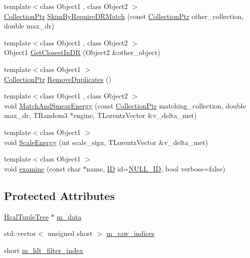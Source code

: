 \begin{DoxyCompactItemize}
\item 
{\footnotesize template$<$class Object1 , class Object2 $>$ }\\\hyperlink{_collection_8h_a64ea9217513944abee0afcb2ee82d787}{Collection\+Ptr} \hyperlink{class_collection_a54e900d55c4ac8031405cf47d9057cf2}{Skim\+By\+Require\+D\+R\+Match} (const \hyperlink{_collection_8h_a64ea9217513944abee0afcb2ee82d787}{Collection\+Ptr} other\+\_\+collection, double max\+\_\+dr)
\item 
{\footnotesize template$<$class Object1 , class Object2 $>$ }\\Object1 \hyperlink{class_collection_ae44c2ce07ad035fa796bd2c9b84f55dd}{Get\+Closest\+In\+D\+R} (Object2 \&other\+\_\+object)
\item 
{\footnotesize template$<$class Object1 $>$ }\\\hyperlink{_collection_8h_a64ea9217513944abee0afcb2ee82d787}{Collection\+Ptr} \hyperlink{class_collection_a49f4130580bee8e31bea180059ab6fc4}{Remove\+Duplicates} ()
\item 
{\footnotesize template$<$class Object1 , class Object2 $>$ }\\void \hyperlink{class_collection_af2614a9b9632132334040e925900774d}{Match\+And\+Smear\+Energy} (const \hyperlink{_collection_8h_a64ea9217513944abee0afcb2ee82d787}{Collection\+Ptr} matching\+\_\+collection, double max\+\_\+dr, T\+Random3 $\ast$engine, T\+Lorentz\+Vector \&v\+\_\+delta\+\_\+met)
\item 
{\footnotesize template$<$class Object1 $>$ }\\void \hyperlink{class_collection_a2d8d04525e4b5ad9fdb0e561ab407ed0}{Scale\+Energy} (int scale\+\_\+sign, T\+Lorentz\+Vector \&v\+\_\+delta\+\_\+met)
\item 
{\footnotesize template$<$class Object1 $>$ }\\void \hyperlink{class_collection_a597be8599a7546094dc33a2dcaadca74}{examine} (const char $\ast$name, \hyperlink{_i_d_types_8h_a094c367727273b4da2b960ca3b3edc06}{I\+D} id=\hyperlink{_i_d_types_8h_a094c367727273b4da2b960ca3b3edc06a67c41dfcde5626af9e05ef5a416e2294}{N\+U\+L\+L\+\_\+\+I\+D}, bool verbose=false)
\end{DoxyCompactItemize}
\subsection*{Protected Attributes}
\begin{DoxyCompactItemize}
\item 
\hyperlink{class_hcal_tuple_tree}{Hcal\+Tuple\+Tree} $\ast$ \hyperlink{class_collection_a856900f84bfbbddaea6610b6c3dc079a}{m\+\_\+data}
\item 
std\+::vector$<$ unsigned short $>$ \hyperlink{class_collection_ac03c12ac003f01bcde775591f5fdba01}{m\+\_\+raw\+\_\+indices}
\item 
short \hyperlink{class_collection_a0cc67f7dee886333510eefb4774d1731}{m\+\_\+hlt\+\_\+filter\+\_\+index}
\end{DoxyCompactItemize}


